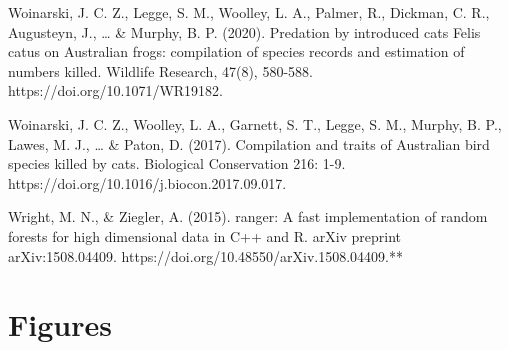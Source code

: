 \documentclass[
  super,
  review,
  3p]{elsarticle}
\begin{document}
Woinarski, J. C. Z., Legge, S. M., Woolley, L. A., Palmer, R., Dickman,
C. R., Augusteyn, J., \ldots{} \& Murphy, B. P. (2020). Predation by
introduced cats Felis catus on Australian frogs: compilation of species
records and estimation of numbers killed. Wildlife Research, 47(8),
580-588. https://doi.org/10.1071/WR19182.

Woinarski, J. C. Z., Woolley, L. A., Garnett, S. T., Legge, S. M.,
Murphy, B. P., Lawes, M. J., \ldots{} \& Paton, D. (2017). Compilation
and traits of Australian bird species killed by cats. Biological
Conservation 216: 1-9. https://doi.org/10.1016/j.biocon.2017.09.017.

Wright, M. N., \& Ziegler, A. (2015). ranger: A fast implementation of
random forests for high dimensional data in C++ and R. arXiv preprint
arXiv:1508.04409. https://doi.org/10.48550/arXiv.1508.04409.**

\hypertarget{figures}{%
\section{\texorpdfstring{\textbf{Figures}}{Figures}}\label{figures}}
\end{document}
